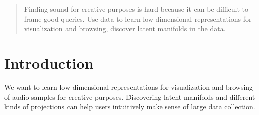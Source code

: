 \documentclass{article}
\begin{document}

\begin{abstract}

Finding sound for creative purposes is hard because it can be difficult to frame good queries.
Use data to learn low-dimensional representations for visualization and browsing, discover latent manifolds in the data.


\end{abstract}

\section{Introduction}
\label{submission}

We want to learn low-dimensional representations for visualization and browsing of audio samples for creative purposes.
Discovering latent manifolds and different kinds of projections can help users intuitively make sense of large data collection.

\end{document}
